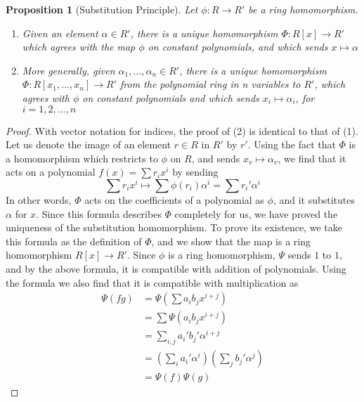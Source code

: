 \documentclass[12pt]{article}
\newtheorem{prop}[thm]{Proposition}
\theoremstyle{definition}
\theoremstyle{remark}
\numberwithin{equation}{section}
\begin{document}
\begin{prop}[Substitution Principle]
        Let $\phi:R\rightarrow R'$ be a ring homomorphism. \begin{enumerate}
                \item Given an element $\alpha \in R'$, there is a unique homomorphism $\Phi: R[x] \rightarrow R'$ which agrees with the map $\phi$ on constant polynomials, and which sends $x \mapsto \alpha$
                \item More generally, given $\alpha_1,...,\alpha_n \in R'$, there is a unique homomorphism $\Phi: R[x_1,...,x_n] \rightarrow R'$ from the polynomial ring in n variables to $R'$, which agrees with $\phi$ on constant polynomials and which sends $x_i\mapsto \alpha_i$, for $i=1,2,...,n$
        \end{enumerate}
\end{prop}
\begin{proof}
        With vector notation for indices, the proof of (2) is identical to that of (1). Let us denote the image of an element $r \in R$ in $R'$ by $r'$. Using the fact that $\Phi$ is a homomorphism which restricts to $\phi$ on $R$, and sends $x_v \mapsto \alpha_v$, we find that it acts on a polynomial $f(x) = \sum r_ix^i$ by sending \begin{equation}
                \sum r_ix^i \mapsto \sum\phi(r_i)\alpha^i = \sum r_i'\alpha^i
        \end{equation}
        In other words, $\Phi$ acts on the coefficients of a polynomial as $\phi$, and it substitutes $\alpha$ for $x$. Since this formula describes $\Phi$ completely for us, we have proved the uniqueness of the substitution homomorphism. To prove its existence, we take this formula as the definition of $\Phi$, and we show that the map is a ring homomorphism $R[x] \rightarrow R'$. Since $\phi$ is a ring homomorphism, $\Psi$ sends $1$ to $1$, and by the above formula, it is compatible with addition of polynomials. Using the formula we also find that it is compatible with multiplication as \begin{align*}
                \Psi(fg) &= \Psi\left(\sum a_ib_jx^{i+j}\right) \\
                &= \sum \Psi(a_ib_jx^{i+j})\\
                &= \sum\limits_{i,j} a_i'b_j'\alpha^{i+j}\\
                &= \left(\sum\limits_ia_i'\alpha^i\right)\left(\sum\limits_jb_j'\alpha^j\right) \\
                &=\Psi(f)\Psi(g)
        \end{align*}
\end{proof}
\end{document}
